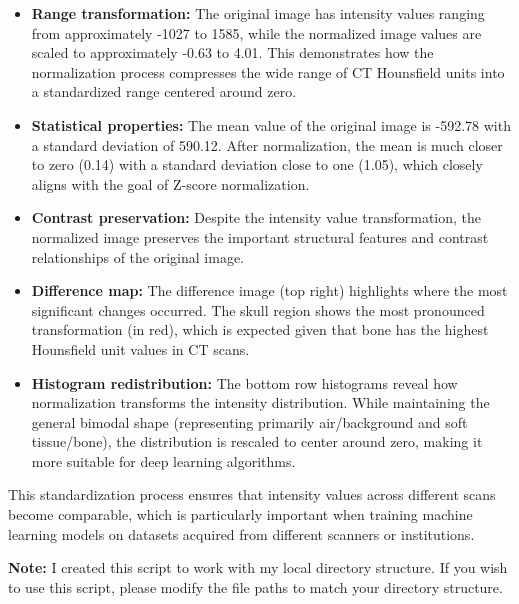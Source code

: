 \begin{itemize}
    \item \textbf{Range transformation:} The original image has intensity values ranging from approximately -1027 to 1585, while the normalized image values are scaled to approximately -0.63 to 4.01. This demonstrates how the normalization process compresses the wide range of CT Hounsfield units into a standardized range centered around zero.
    
    \item \textbf{Statistical properties:} The mean value of the original image is -592.78 with a standard deviation of 590.12. After normalization, the mean is much closer to zero (0.14) with a standard deviation close to one (1.05), which closely aligns with the goal of Z-score normalization.
    
    \item \textbf{Contrast preservation:} Despite the intensity value transformation, the normalized image preserves the important structural features and contrast relationships of the original image.
   
    \item \textbf{Difference map:} The difference image (top right) highlights where the most significant changes occurred. The skull region shows the most pronounced transformation (in red), which is expected given that bone has the highest Hounsfield unit values in CT scans.
    
    \item \textbf{Histogram redistribution:} The bottom row histograms reveal how normalization transforms the intensity distribution. While maintaining the general bimodal shape (representing primarily air/background and soft tissue/bone), the distribution is rescaled to center around zero, making it more suitable for deep learning algorithms.
\end{itemize}

This standardization process ensures that intensity values across different scans become comparable, which is particularly important when training machine learning models on datasets acquired from different scanners or institutions.

\textbf{Note:} I created this script to work with my local directory structure. If you wish to use this script, please modify the file paths to match your directory structure.